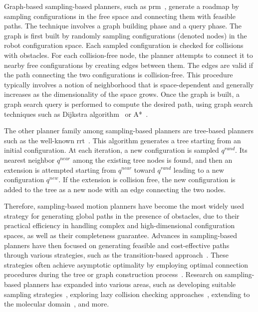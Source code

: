 Graph-based sampling-based planners, such as \gls{prm}~\cite{cPRM}, generate a roadmap by sampling configurations in the free space and connecting them with feasible paths. 
The technique involves a graph building phase and a query phase.
The graph is first built by randomly sampling configurations (denoted nodes) in the robot configuration space.
Each sampled configuration is checked for collisions with obstacles.
For each collision-free node, the planner attempts to connect it to nearby free configurations by creating edges between them.  
The edges are valid if the path connecting the two configurations is collision-free.
This procedure typically involves a notion of neighborhood that is space-dependent and generally increases as the dimensionality of the space grows.
Once the graph is built, a graph search query is performed to compute the desired path, using graph search techniques such as Dijkstra algorithm~\cite{cDijk} or A*~\cite{cA*}.

The other planner family among sampling-based planners are tree-based planners such as the well-known \gls{rrt}~\cite{cRRT}.
This algorithm generates a tree starting from an initial configuration.
At each iteration, a new configuration is sampled $q^{rand}$.
Its nearest neighbor $q^{near}$ among the existing tree nodes is found, and then an extension is attempted starting from $q^{near}$ toward $q^{rand}$ leading to a new configuration $q^{new}$.
If the extension is collision free, the new configuration is added to the tree as a new node with an edge connecting the two nodes.

Therefore, sampling-based motion planners have become the most widely used strategy for generating global paths in the presence of obstacles, due to their practical efficiency in handling complex and high-dimensional configuration spaces, as well as their completeness guarantee.
Advances in sampling-based planners have then focused on generating feasible and cost-effective paths through various strategies, such as the transition-based approach~\cite{cTRRT}. 
These strategies often achieve asymptotic optimality by employing optimal connection procedures during the tree or graph construction process~\cite{cRRTstar, cTRRTstar, cFMT}.
Research on sampling-based planners has expanded into various areas, such as developing suitable sampling strategies~\cite{cSampling}, exploring lazy collision checking approaches~\cite{cLazy1}, extending to the molecular domain~\cite{cMolecular}, and more.

